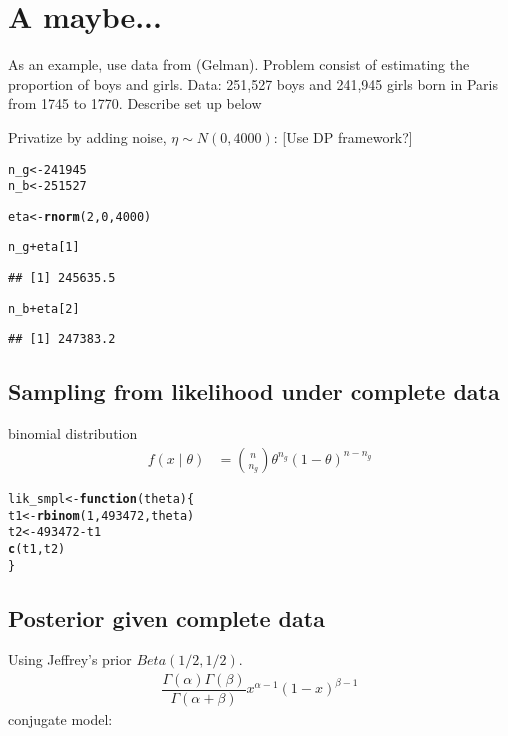 \documentclass{article}\usepackage[]{graphicx}\usepackage[]{xcolor}
\makeatletter
\newcommand{\hlnum}[1]{\textcolor[rgb]{0.686,0.059,0.569}{#1}}%
\newcommand{\hlopt}[1]{\textcolor[rgb]{0,0,0}{#1}}%
\newcommand{\hlstd}[1]{\textcolor[rgb]{0.345,0.345,0.345}{#1}}%
\newcommand{\hlkwa}[1]{\textcolor[rgb]{0.161,0.373,0.58}{\textbf{#1}}}%
\newcommand{\hlkwb}[1]{\textcolor[rgb]{0.69,0.353,0.396}{#1}}%
\newcommand{\hlkwc}[1]{\textcolor[rgb]{0.333,0.667,0.333}{#1}}%
\newcommand{\hlkwd}[1]{\textcolor[rgb]{0.737,0.353,0.396}{\textbf{#1}}}%
\newenvironment{kframe}{%
 \def\at@end@of@kframe{}%
 \ifinner\ifhmode%
  \def\at@end@of@kframe{\end{minipage}}%
  \begin{minipage}{\columnwidth}%
 \fi\fi%
 \def\FrameCommand##1{\hskip\@totalleftmargin \hskip-\fboxsep
 \colorbox{shadecolor}{##1}\hskip-\fboxsep
     \hskip-\linewidth \hskip-\@totalleftmargin \hskip\columnwidth}%
 \MakeFramed {\advance\hsize-\width
   \@totalleftmargin\z@ \linewidth\hsize
   \@setminipage}}%
 {\par\unskip\endMakeFramed%
 \at@end@of@kframe}
\newenvironment{knitrout}{}{} %
\theoremstyle{definition}
\makeatother
\begin{document}
\newpage

\section*{A maybe...}


As an example, use data from (Gelman). Problem
consist of estimating the proportion of boys and girls.
Data: 251,527 boys and 241,945 girls born in Paris
from 1745 to 1770. Describe set up below

Privatize by adding noise, $\eta \sim N(0, 4000)$:
[Use DP framework?]
\begin{knitrout}
\color{fgcolor}\begin{kframe}
\begin{alltt}
\hlstd{n_g} \hlkwb{<-} \hlnum{241945}
\hlstd{n_b} \hlkwb{<-} \hlnum{251527}

\hlstd{eta} \hlkwb{<-} \hlkwd{rnorm}\hlstd{(}\hlnum{2}\hlstd{,}\hlnum{0}\hlstd{,}\hlnum{4000}\hlstd{)}

\hlstd{n_g} \hlopt{+} \hlstd{eta[}\hlnum{1}\hlstd{]}
\end{alltt}
\begin{verbatim}
## [1] 245635.5
\end{verbatim}
\begin{alltt}
\hlstd{n_b} \hlopt{+} \hlstd{eta[}\hlnum{2}\hlstd{]}
\end{alltt}
\begin{verbatim}
## [1] 247383.2
\end{verbatim}
\end{kframe}
\end{knitrout}

\subsection*{Sampling from likelihood under complete data}
binomial distribution
\begin{align*}
f(x \mid \theta) &= \binom{n}{n_g} \theta^{n_g}(1-\theta)^{n-n_g}
\end{align*}

\begin{knitrout}
\color{fgcolor}\begin{kframe}
\begin{alltt}
\hlstd{lik_smpl} \hlkwb{<-} \hlkwa{function}\hlstd{(}\hlkwc{theta}\hlstd{) \{}
  \hlstd{t1} \hlkwb{<-} \hlkwd{rbinom}\hlstd{(}\hlnum{1}\hlstd{,} \hlnum{493472}\hlstd{, theta)}
  \hlstd{t2} \hlkwb{<-} \hlnum{493472} \hlopt{-} \hlstd{t1}
  \hlkwd{c}\hlstd{(t1,t2)}
\hlstd{\}}
\end{alltt}
\end{kframe}
\end{knitrout}

\subsection*{Posterior given complete data}
Using Jeffrey's prior $Beta(1/2,1/2)$.
\begin{align*}
\dfrac{\Gamma(\alpha)\Gamma(\beta)}{\Gamma(\alpha + \beta)}x^{\alpha -1}(1-x)^{\beta-1}
\end{align*}
conjugate model:




\nocite{*}


\end{document}
